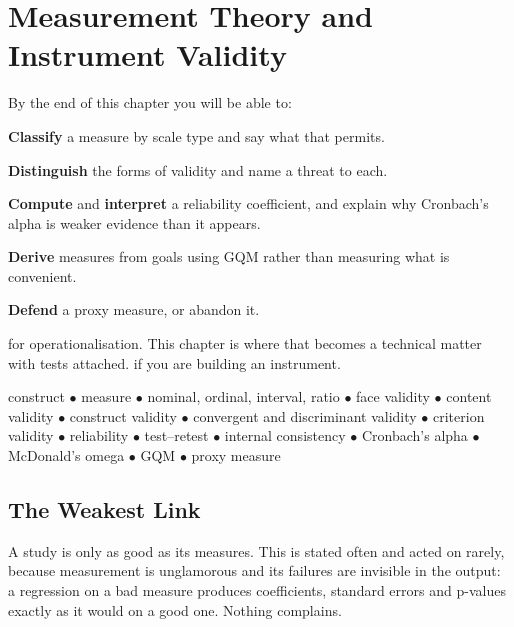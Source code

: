 \chapter{Measurement Theory and Instrument Validity}\label{ch:measurement}

\begin{outcomes}
By the end of this chapter you will be able to:
\begin{tight}
  \item \textbf{Classify} a measure by scale type and say what that permits.
  \item \textbf{Distinguish} the forms of validity and name a threat to each.
  \item \textbf{Compute} and \textbf{interpret} a reliability coefficient, and
    explain why Cronbach's alpha is weaker evidence than it appears.
  \item \textbf{Derive} measures from goals using GQM rather than measuring
    what is convenient.
  \item \textbf{Defend} a proxy measure, or abandon it.
\end{tight}
\end{outcomes}

\begin{prereq}
 for operationalisation. This chapter is where that becomes a
technical matter with tests attached.  if you are building an
instrument.
\end{prereq}

\begin{keyterms}
construct $\bullet$ measure $\bullet$ nominal, ordinal, interval, ratio
$\bullet$ face validity $\bullet$ content validity $\bullet$ construct validity
$\bullet$ convergent and discriminant validity $\bullet$ criterion validity
$\bullet$ reliability $\bullet$ test--retest $\bullet$ internal consistency
$\bullet$ Cronbach's alpha $\bullet$ McDonald's omega $\bullet$ GQM $\bullet$
proxy measure
\end{keyterms}

\section{The Weakest Link}

A study is only as good as its measures. This is stated often and acted on
rarely, because measurement is unglamorous and its failures are invisible in
the output: a regression on a bad measure produces coefficients, standard
errors and p-values exactly as it would on a good one. Nothing complains.

